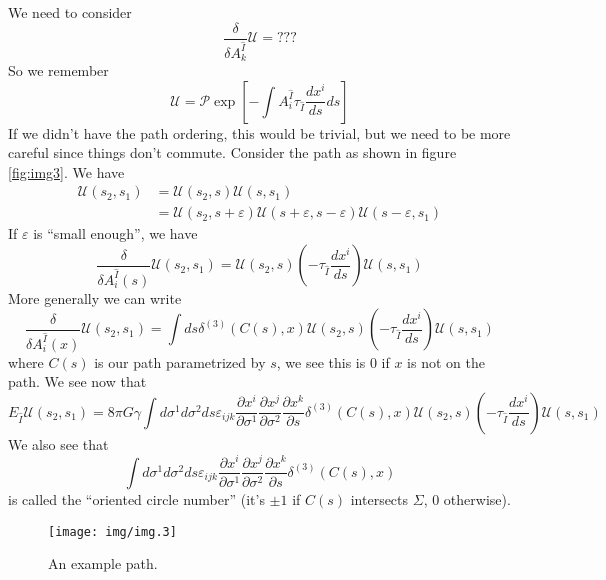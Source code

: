 We need to consider 
\begin{equation}
\frac{\delta}{\delta A^{\hat{I}}_{k}}\mathcal{U}=???
\end{equation}
So we remember
\begin{equation}
\mathcal{U} = \mathcal{P}\exp\left[-\int A^{\hat{I}}_{i}\tau_{\hat{I}}\frac{dx^i}{ds}ds\right]
\end{equation}
If we didn't have the path ordering, this would be trivial, but
we need to be more careful since things don't commute. Consider
the path as shown in figure \eqref{fig:img3}. We have
\begin{subequations}
\begin{align}
\mathcal{U}(s_2,s_1) &= \mathcal{U}(s_2,s)\mathcal{U}(s,s_1)\\
&= \mathcal{U}(s_2,s+\varepsilon)\mathcal{U}(s+\varepsilon,s-\varepsilon)\mathcal{U}(s-\varepsilon,s_1)
\end{align}
\end{subequations}
If $\varepsilon$ is ``small enough'', we have
\begin{equation}
\frac{\delta}{\delta A^{\hat{I}}_{i}(s)}\mathcal{U}(s_2,s_1) =
\mathcal{U}(s_2,s)\left(-\tau_{\hat{I}}\frac{dx^i}{ds}\right)\mathcal{U}(s,s_1)
\end{equation}
More generally we can write
\begin{equation}
\frac{\delta}{\delta A^{\hat{I}}_{i}(x)}\mathcal{U}(s_2,s_1) =
\int ds \delta^{(3)}(C(s),x)\mathcal{U}(s_2,s)\left(-\tau_{\hat{I}}\frac{dx^i}{ds}\right)\mathcal{U}(s,s_1)
\end{equation}
where $C(s)$ is our path parametrized by $s$, we see this is 0 if
$x$ is not on the path. We see now that
\begin{equation}
E_{\hat{I}}\mathcal{U}(s_2,s_1) = 8\pi G\gamma \int d\sigma^1 d\sigma^2 ds \varepsilon_{ijk}\frac{\partial
  x^i}{\partial \sigma^1}\frac{\partial x^j}{\partial
  \sigma^2}\frac{\partial x^k}{\partial s}\delta^{(3)}(C(s),x)\mathcal{U}(s_2,s)\left(-\tau_{\hat{I}}\frac{dx^i}{ds}\right)\mathcal{U}(s,s_1)
\end{equation}
We also see that
\begin{equation}
\int d\sigma^1 d\sigma^2 ds \varepsilon_{ijk}\frac{\partial
  x^i}{\partial \sigma^1}\frac{\partial x^j}{\partial
  \sigma^2}\frac{\partial x^k}{\partial s}\delta^{(3)}(C(s),x)
\end{equation}
is called the ``oriented circle number'' (it's $\pm1$ if $C(s)$
intersects $\Sigma$, 0 otherwise).
\begin{figure}[H]
\begin{center}
  \texttt{[image: img/img.3]}
\end{center}
\caption{An example path.}\label{fig:img3}
\end{figure}

